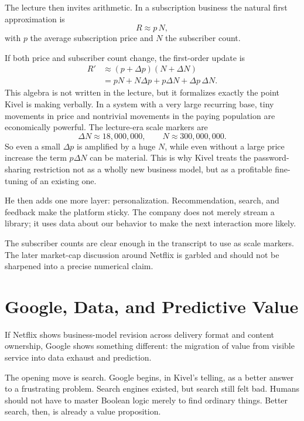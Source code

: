 The lecture then invites arithmetic. In a subscription business the natural first approximation is
\begin{equation}
R \approx p\,N,
\end{equation}
with \(p\) the average subscription price and \(N\) the subscriber count.

If both price and subscriber count change, the first-order update is
\begin{align}
R' &\approx (p+\Delta p)(N+\Delta N) \\
   &= pN + N\Delta p + p\Delta N + \Delta p\,\Delta N.
\end{align}
This algebra is not written in the lecture, but it formalizes exactly the point Kivel is making verbally. In a system with a very large recurring base, tiny movements in price and nontrivial movements in the paying population are economically powerful. The lecture-era scale markers are
\begin{equation}
\Delta N \approx 18{,}000{,}000,
\qquad
N \approx 300{,}000{,}000.
\end{equation}
So even a small \(\Delta p\) is amplified by a huge \(N\), while even without a large price increase the term \(p\Delta N\) can be material. This is why Kivel treats the password-sharing restriction not as a wholly new business model, but as a profitable fine-tuning of an existing one.

He then adds one more layer: personalization. Recommendation, search, and feedback make the platform sticky. The company does not merely stream a library; it uses data about our behavior to make the next interaction more likely.

\begin{remark}
The subscriber counts are clear enough in the transcript to use as scale markers. The later market-cap discussion around Netflix is garbled and should not be sharpened into a precise numerical claim.
\end{remark}

\section{Google, Data, and Predictive Value}

If Netflix shows business-model revision across delivery format and content ownership, Google shows something different: the migration of value from visible service into data exhaust and prediction.

The opening move is search. Google begins, in Kivel's telling, as a better answer to a frustrating problem. Search engines existed, but search still felt bad. Humans should not have to master Boolean logic merely to find ordinary things. Better search, then, is already a value proposition.

